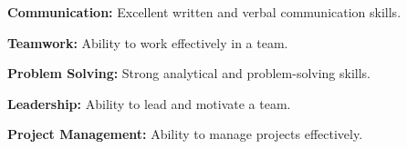 
\begin{onecolentry}
   \textbf{Communication:} Excellent written and verbal communication skills.
   \vspace*{0.1 cm}

   \textbf{Teamwork:} Ability to work effectively in a team.
   \vspace*{0.1 cm}

   \textbf{Problem Solving:} Strong analytical and problem-solving skills.
   \vspace*{0.1 cm}

   \textbf{Leadership:} Ability to lead and motivate a team.
   \vspace*{0.1 cm}

   \textbf{Project Management:} Ability to manage projects effectively.
\end{onecolentry}